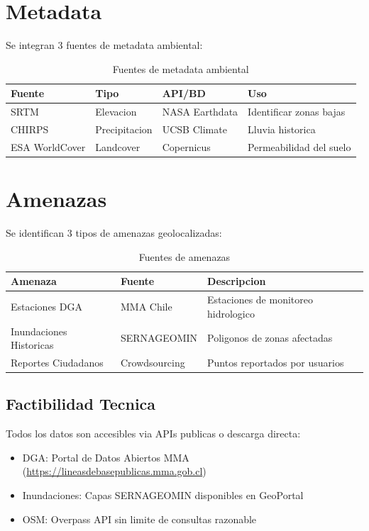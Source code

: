 \documentclass[12pt,a4paper]{article}
\begin{document}
\section{Metadata}

Se integran 3 fuentes de metadata ambiental:

\begin{table}[h]
\centering
\begin{tabular}{@{}llll@{}}
\toprule
\textbf{Fuente} & \textbf{Tipo} & \textbf{API/BD} & \textbf{Uso} \\
\midrule
SRTM & Elevacion & NASA Earthdata & Identificar zonas bajas \\
CHIRPS & Precipitacion & UCSB Climate & Lluvia historica \\
ESA WorldCover & Landcover & Copernicus & Permeabilidad del suelo \\
\bottomrule
\end{tabular}
\caption{Fuentes de metadata ambiental}
\end{table}

\section{Amenazas}

Se identifican 3 tipos de amenazas geolocalizadas:

\begin{table}[h]
\centering
\begin{tabular}{@{}llp{6cm}@{}}
\toprule
\textbf{Amenaza} & \textbf{Fuente} & \textbf{Descripcion} \\
\midrule
Estaciones DGA & MMA Chile & Estaciones de monitoreo hidrologico \\
Inundaciones Historicas & SERNAGEOMIN & Poligonos de zonas afectadas \\
Reportes Ciudadanos & Crowdsourcing & Puntos reportados por usuarios \\
\bottomrule
\end{tabular}
\caption{Fuentes de amenazas}
\end{table}

\subsection{Factibilidad Tecnica}
Todos los datos son accesibles via APIs publicas o descarga directa:
\begin{itemize}
    \item DGA: Portal de Datos Abiertos MMA (\url{https://lineasdebasepublicas.mma.gob.cl})
    \item Inundaciones: Capas SERNAGEOMIN disponibles en GeoPortal
    \item OSM: Overpass API sin limite de consultas razonable
\end{itemize}
\end{document}
